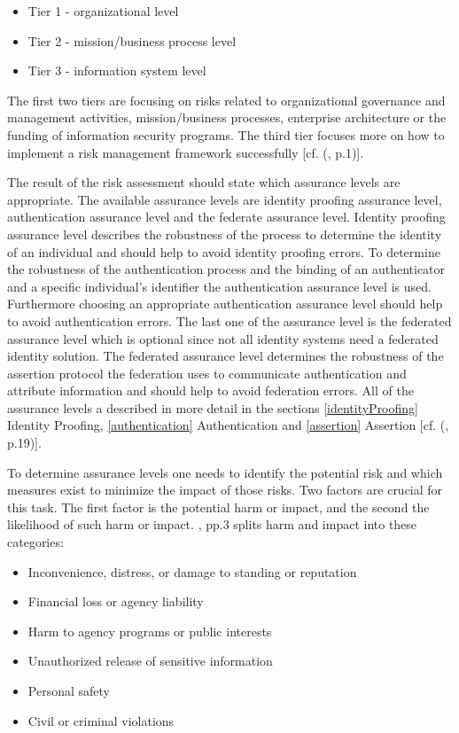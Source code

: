 \begin{itemize}
	\item Tier 1 - organizational level
	\item Tier 2 - mission/business process level
	\item Tier 3 - information system level
\end{itemize}

The first two tiers are focusing on risks related to organizational governance and management activities, mission/business processes, enterprise architecture or the funding of information security programs. The third tier focuses more on how to implement a risk management framework successfully [cf. (\cite{NIST:2012:GCRA}, p.1)]. 

The result of the risk assessment should state which assurance levels are appropriate.
The available assurance levels are identity proofing assurance level, authentication assurance level and the federate assurance level. Identity proofing assurance level describes the robustness of the process to determine the identity of an individual and should help to avoid identity proofing errors. To determine the robustness of the authentication process and the binding of an authenticator and a specific individual's identifier the authentication assurance level is used. Furthermore choosing an appropriate authentication assurance level should help to avoid authentication errors. The last one of the assurance level is the federated assurance level which is optional since not all identity systems need a federated identity solution. The federated assurance level determines the robustness of the assertion protocol the federation uses to communicate authentication and attribute information and should help to avoid federation errors. All of the assurance levels a described in more detail in the sections \ref{identityProofing} Identity Proofing, \ref{authentication} Authentication and  \ref{assertion} Assertion [cf. (\cite{NIST:2017:DIG}, p.19)]. 

To determine assurance levels one needs to identify the potential risk and which measures exist to minimize the impact of those risks. Two factors are crucial for this task. The first factor is the potential harm or impact, and the second the likelihood of such harm or impact. \cite{Bolton:2003:EAuth}, pp.3 splits harm and impact into these categories:

\begin{itemize}
	\item Inconvenience, distress, or damage to standing or reputation
	\item Financial loss or agency liability
	\item Harm to agency programs or public interests
	\item Unauthorized release of sensitive information
	\item Personal safety
	\item Civil or criminal violations
\end{itemize}

